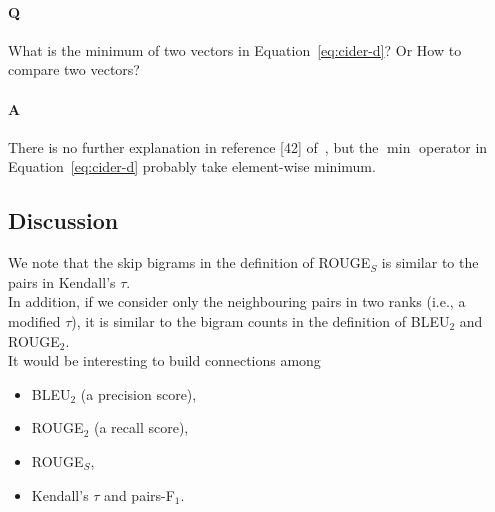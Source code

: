 {\it
\paragraph{Q} What is the minimum of two vectors in Equation~\ref{eq:cider-d}? Or How to compare two vectors?

\paragraph{A} There is no further explanation in reference [42] of~\cite{chen2015microsoft}, 
but the $\min$ operator in Equation~\ref{eq:cider-d} probably take element-wise minimum.
}


\subsection{Discussion}

We note that the skip bigrams in the definition of ROUGE$_S$ is similar to the pairs in Kendall's $\tau$. \\
In addition, if we consider only the neighbouring pairs in two ranks (i.e., a modified $\tau$), 
it is similar to the bigram counts in the definition of BLEU$_2$ and ROUGE$_2$. \\
It would be interesting to build connections among 
\begin{itemize}
\item BLEU$_2$ (a precision score), 
\item ROUGE$_2$ (a recall score), 
\item ROUGE$_S$, 
\item Kendall's $\tau$ and pairs-F$_1$.
\end{itemize}
